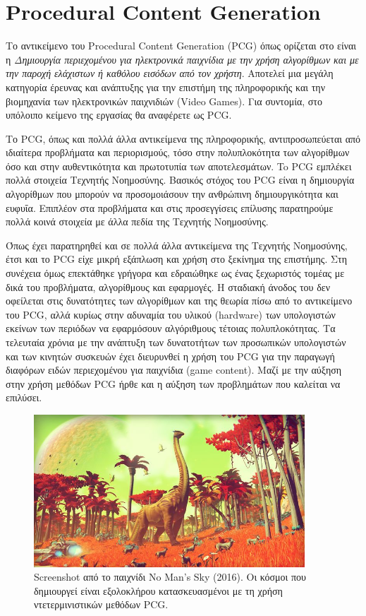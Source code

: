\thispagestyle{empty}

\chapter{Procedural Content Generation}

Το αντικείμενο του Procedural Content Generation (PCG) όπως ορίζεται στο 
\cite{pcgdef} είναι η \textit{Δημιουργία περιεχομένου για ηλεκτρονικά παιχνίδια με την χρήση αλγορίθμων και με την παροχή ελάχιστων ή καθόλου εισόδων από τον χρήστη}. Αποτελεί μια μεγάλη κατηγορία έρευνας και ανάπτυξης για την επιστήμη της πληροφορικής \cite{futureofcontent} και την βιομηχανία των ηλεκτρονικών παιχνιδιών (Video Games). Για συντομία, στο υπόλοιπο κείμενο της εργασίας θα αναφέρετε ως PCG.
\par
Το PCG, όπως και πολλά άλλα αντικείμενα της πληροφορικής, αντιπροσωπεύεται από ιδιαίτερα προβλήματα και περιορισμούς, τόσο στην πολυπλοκότητα των αλγορίθμων όσο και στην αυθεντικότητα και πρωτοτυπία των αποτελεσμάτων. To PCG εμπλέκει πολλά στοιχεία Τεχνητής Νοημοσύνης. Βασικός στόχος του PCG είναι η δημιουργία αλγορίθμων που μπορούν να προσομοιάσουν την ανθρώπινη δημιουργικότητα και ευφυΐα. Επιπλέον στα προβλήματα και στις προσεγγίσεις επίλυσης παρατηρούμε πολλά κοινά στοιχεία με άλλα πεδία της Τεχνητής Νοημοσύνης.
\par
Όπως έχει παρατηρηθεί και σε πολλά άλλα αντικείμενα της Τεχνητής Νοημοσύνης, έτσι και το PCG είχε μικρή εξάπλωση και χρήση στο ξεκίνημα της επιστήμης. Στη συνέχεια όμως επεκτάθηκε γρήγορα και εδραιώθηκε ως ένας ξεχωριστός τομέας με δικά του προβλήματα, αλγορίθμους και εφαρμογές. Η σταδιακή άνοδος του δεν οφείλεται στις δυνατότητες των αλγορίθμων και της θεωρία πίσω από το αντικείμενο του PCG, αλλά κυρίως στην αδυναμία του υλικού (hardware) των υπολογιστών εκείνων των περιόδων να εφαρμόσουν αλγόριθμους τέτοιας πολυπλοκότητας. Τα τελευταία χρόνια με την ανάπτυξη των δυνατοτήτων των προσωπικών υπολογιστών και των κινητών συσκευών έχει διευρυνθεί η χρήση του PCG για την παραγωγή διαφόρων ειδών περιεχομένου για παιχνίδια (game content). Μαζί με την αύξηση στην χρήση μεθόδων PCG ήρθε και η αύξηση των προβλημάτων που καλείται να επιλύσει.

\begin{figure}[ht]
\centering
\includegraphics[width=4in]{../images/no-mans-sky.jpg}
\caption{Screenshot από το παιχνίδι No Man's Sky (2016). Οι κόσμοι που δημιουργεί είναι εξολοκλήρου κατασκευασμένοι με τη χρήση ντετερμινιστικών μεθόδων PCG.}
\end{figure}


